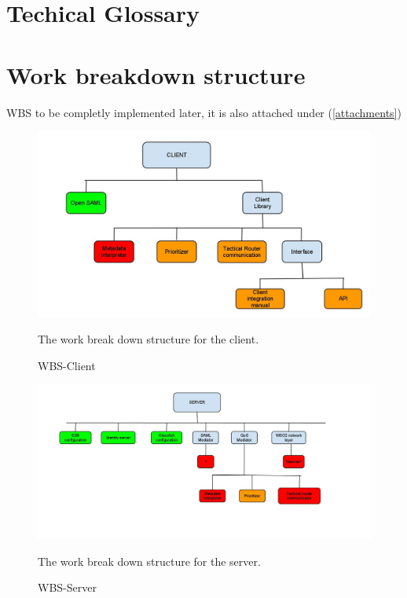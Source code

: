 \documentclass[12pt]{article}
\begin{document}
\appendix
\section{Techical Glossary}\label{glossary}
    
\section{Work breakdown structure}\label{WBS}
    WBS to be completly implemented later, it is also attached under (\ref{attachments})
    
        \begin{figure}[htb]
            \centering
            \includegraphics[scale=0.3]{wbsClient}
            \caption{WBS-Client}
            The work break down structure for the client.
            \label{fig:wbsClient}
        \end{figure}
        
        \begin{figure}[htb]
            \centering
            \includegraphics[scale=0.3]{wbsServer}
            \caption{WBS-Server}
            The work break down structure for the server.
            \label{fig:wbdServer}
        \end{figure}
    
\end{document}
